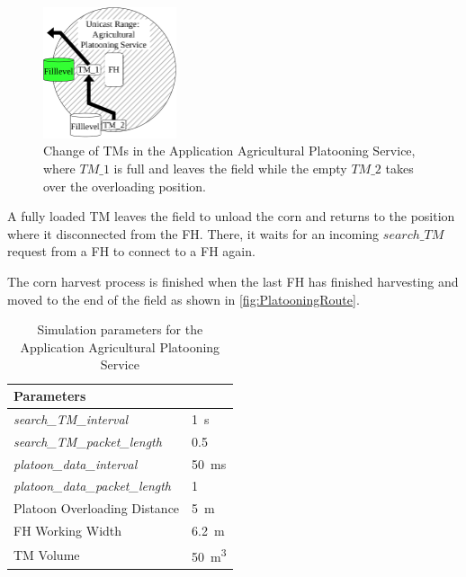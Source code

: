 \begin{figure}[]%
	\centering
	\includegraphics[width=0.35\textwidth]{figures/platoonFULL}
	\caption{Change of \acf{TM}s in the Application Agricultural Platooning Service, where $TM\_1$
	is full and leaves the field while the empty $TM\_2$ takes over the overloading position.}
	\label{fig:PlatooningFull}%
\end{figure}

A fully loaded \ac{TM} leaves the field to unload the corn and returns to the position where it disconnected from the \ac{FH}.
There, it waits for an incoming $search\_TM$ request from a \ac{FH} to connect to a \ac{FH} again.

The corn harvest process is finished when the last \ac{FH} has finished harvesting and moved to the end of the field as
shown in \autoref{fig:PlatooningRoute}.

\begin{table}[H]
	\centering
	\begin{tabular}{p{5cm}p{4cm}}
		\toprule
		Parameters & \\
		\midrule
		\textit{search\_TM\_interval} & \SI{1}{\second}\\
		\textit{search\_TM\_packet\_length} & \SI{0.5}{\kilo\byte}\\
		\textit{platoon\_data\_interval} & \SI{50}{\milli\second}\\
		\textit{platoon\_data\_packet\_length} & \SI{1}{\kilo\byte}\\
		Platoon Overloading Distance & \SI{5}{\meter}\\
		\ac{FH} Working Width & \SI{6.2}{\meter}\\
		\ac{TM} Volume & \SI{50}{\cubic\meter}\\
		\bottomrule
	\end{tabular}
	\caption{Simulation parameters for the Application Agricultural Platooning Service}
	\label{tab:SimulationParameters}
\end{table}

